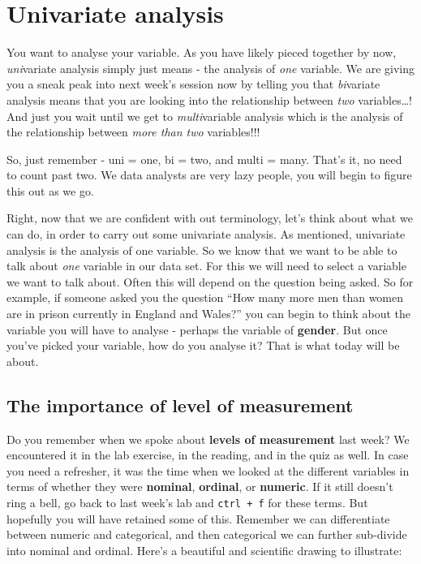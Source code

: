 \documentclass[
]{book}
\begin{document}
\hypertarget{univariate-analysis}{%
\section{Univariate analysis}\label{univariate-analysis}}

You want to analyse your variable. As you have likely pieced together by now, \emph{uni}variate analysis simply just means - the analysis of \emph{one} variable. We are giving you a sneak peak into next week's session now by telling you that \emph{bi}variate analysis means that you are looking into the relationship between \emph{two} variables\ldots! And just you wait until we get to \emph{multi}variable analysis which is the analysis of the relationship between \emph{more than two} variables!!!

So, just remember - uni = one, bi = two, and multi = many. That's it, no need to count past two. We data analysts are very lazy people, you will begin to figure this out as we go.

Right, now that we are confident with out terminology, let's think about what we can do, in order to carry out some univariate analysis. As mentioned, univariate analysis is the analysis of one variable. So we know that we want to be able to talk about \emph{one} variable in our data set. For this we will need to select a variable we want to talk about. Often this will depend on the question being asked. So for example, if someone asked you the question ``How many more men than women are in prison currently in England and Wales?'' you can begin to think about the variable you will have to analyse - perhaps the variable of \textbf{gender}. But once you've picked your variable, how do you analyse it? That is what today will be about.

\hypertarget{the-importance-of-level-of-measurement}{%
\subsection{The importance of level of measurement}\label{the-importance-of-level-of-measurement}}

Do you remember when we spoke about \textbf{levels of measurement} last week? We encountered it in the lab exercise, in the reading, and in the quiz as well. In case you need a refresher, it was the time when we looked at the different variables in terms of whether they were \textbf{nominal}, \textbf{ordinal}, or \textbf{numeric}. If it still doesn't ring a bell, go back to last week's lab and \texttt{ctrl\ +\ f} for these terms. But hopefully you will have retained some of this. Remember we can differentiate between numeric and categorical, and then categorical we can further sub-divide into nominal and ordinal. Here's a beautiful and scientific drawing to illustrate:
\end{document}
